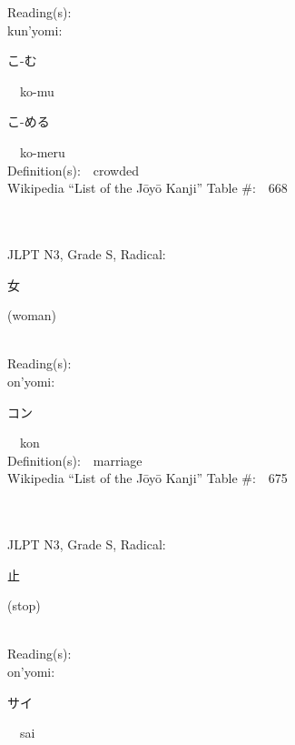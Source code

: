 \begin{multicols}{2}
Reading(s):\ \ \\
{\hspace*{1em}}kun'yomi:\ \ \\
{\hspace*{2em}}{\begin{CJK}{UTF8}{min} こ-む \end{CJK}}\ \ ko-mu\ \ \\
{\hspace*{2em}}{\begin{CJK}{UTF8}{min} こ-める \end{CJK}}\ \ ko-meru\ \ \\
Definition(s):\ \ crowded \\
Wikipedia ``List of the J\=oy\=o Kanji'' Table \#:\ \ 668 \\
\ \ \\
{\fontsize{34pt}{40pt}  }\ \ \\  %
{JLPT N3, Grade S, Radical:\ \ {\begin{CJK}{UTF8}{min} 女 \end{CJK}} (woman) } \\
Reading(s):\ \ \\
{\hspace*{1em}}on'yomi:\ \ \\
{\hspace*{2em}}{\begin{CJK}{UTF8}{min} コン \end{CJK}}\ \ kon\ \ \\
Definition(s):\ \ marriage \\
Wikipedia ``List of the J\=oy\=o Kanji'' Table \#:\ \ 675 \\
\ \ \\
{\fontsize{34pt}{40pt}  }\ \ \\  %
{JLPT N3, Grade S, Radical:\ \ {\begin{CJK}{UTF8}{min} 止 \end{CJK}} (stop) } \\
Reading(s):\ \ \\
{\hspace*{1em}}on'yomi:\ \ \\
{\hspace*{2em}}{\begin{CJK}{UTF8}{min} サイ \end{CJK}}\ \ sai\ \ \\

\end{multicols}
